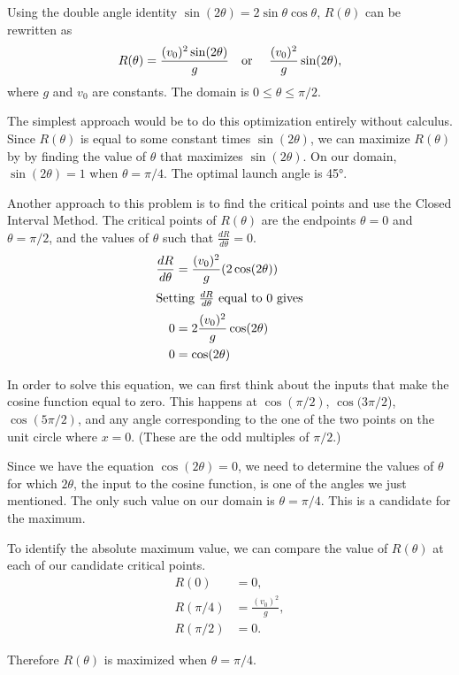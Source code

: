 \documentclass[main]{subfiles}
\begin{document}
\begin{enumerate}
\begin{solution}
Using the double angle identity $\sin(2\theta)=2\sin\theta\cos\theta$,
$R(\theta)$ can be rewritten as 
\[R(\theta)=\frac{(v_0)^2\sin(2\theta)}{g} \text{\quad or \quad} 
\frac{(v_0)^2}{g} \sin(2\theta),\]
where $g$ and $v_0$ are constants. The domain is 
$0\leq\theta\leq\pi/2$.

The simplest approach would be to do this optimization entirely without calculus. Since $R(\theta)$ is equal to some constant times 
$\sin(2\theta)$, we can maximize $R(\theta)$ by by finding the value 
of $\theta$ that maximizes $\sin(2\theta)$. On our domain, 
$\sin(2\theta)=1$ when $\theta=\pi/4$. The optimal launch angle is 
\ang{45}.

Another approach to this problem is to find the critical points and use the Closed Interval Method. The
critical points of $R(\theta)$ are the endpoints $\theta=0$ and 
$\theta=\pi/2$, and the values of 
$\theta$ such that $\frac{dR}{d\theta}=0$.
\begin{align*}
\frac{dR}{d\theta} &= \frac{(v_0)^2}{g} (2\cos(2\theta)) \\
\shortintertext{Setting $\frac{dR}{d\theta}$ equal to 0 gives}
0 &= 2\frac{(v_0)^2}{g}\cos(2\theta) \\
0 &= \cos(2\theta)
\end{align*}

In order to solve this equation, we can first think about the inputs
that make the cosine function equal to zero. This happens at 
$\cos(\pi/2)$, $\cos(3\pi/2$), $\cos(5\pi/2)$, and any angle 
corresponding to the one of the two points on the unit circle where 
$x=0$. (These are the odd multiples of $\pi/2$.) 

Since we have
the equation $\cos(2\theta)=0$, we need
to determine the values of $\theta$ for which $2\theta$, the input
to the cosine function, is one of
the angles we just mentioned. The only such value on our domain is 
$\theta = \pi/4$. This is a candidate for the maximum.

To identify the absolute maximum value, we can
compare the value of $R(\theta)$ at each of our candidate critical
points.
\begin{align*}
R(0) &= 0, \\
R(\pi/4) &= \frac{(v_0)^2}{g}, \\
R(\pi/2) &= 0.
\end{align*}

Therefore $R(\theta)$ is maximized when $\theta = \pi/4$.


\end{solution}
\end{enumerate}
\end{document}
